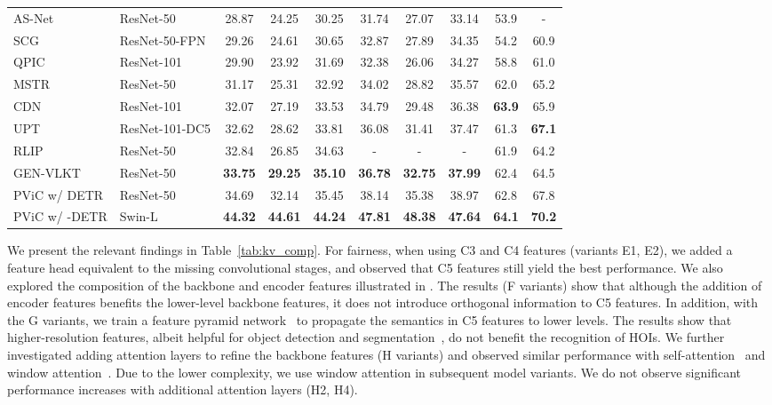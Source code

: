 \documentclass[10pt,twocolumn,letterpaper]{article}
\begin{document}
\begin{table*}[t]
\begin{tabularx}{\linewidth}{@{\extracolsep{\fill}} l l cccccccc}
      AS-Net~\cite{asnet} & ResNet-50 & 28.87 & 24.25 & 30.25 & 31.74 & 27.07 & 33.14 & 53.9 & - \\
      SCG~\cite{scg} & ResNet-50-FPN & 29.26 & 24.61 & 30.65 & 32.87 & 27.89 & 34.35 & 54.2 & 60.9 \\
      QPIC~\cite{qpic} & ResNet-101 & 29.90 & 23.92 & 31.69 & 32.38 & 26.06 & 34.27 & 58.8 & 61.0 \\
      MSTR~\cite{mstr} & ResNet-50 & 31.17 & 25.31 & 32.92 & 34.02 & 28.82 & 35.57 & 62.0 & 65.2 \\
      CDN~\cite{cdn} & ResNet-101 & 32.07 & 27.19 & 33.53 & 34.79 & 29.48 & 36.38 & \textbf{63.9} & 65.9 \\
      UPT~\cite{upt} & ResNet-101-DC5 & 32.62 & 28.62 & 33.81 & 36.08 & 31.41 & 37.47 & 61.3 & \textbf{67.1} \\
      RLIP~\cite{rlip} & ResNet-50 & 32.84 & 26.85 & 34.63 & - & - & - & 61.9 & 64.2 \\
      GEN-VLKT~\cite{gen-vlkt} & ResNet-50 & \textbf{33.75} & \textbf{29.25} & \textbf{35.10} & \textbf{36.78} & \textbf{32.75} & \textbf{37.99} & 62.4 & 64.5 \\
\midrule
     PViC w/ DETR & ResNet-50 & 34.69 & 32.14 & 35.45 & 38.14 & 35.38 & 38.97 & 62.8 & 67.8 \\
     PViC w/ -DETR & Swin-L & \textbf{44.32} & \textbf{44.61} & \textbf{44.24} & \textbf{47.81} & \textbf{48.38} & \textbf{47.64} & \textbf{64.1} & \textbf{70.2} \\
       \bottomrule
    \end{tabularx}
\end{table*}

We present the relevant findings in Table~\ref{tab:kv_comp}. For fairness, when using C3 and C4 features (variants E1, E2), we added a feature head equivalent to the missing convolutional stages, and observed that C5 features still yield the best performance. We also explored the composition of the backbone and encoder features illustrated in . The results (F variants) show that although the addition of encoder features benefits the lower-level backbone features, it does not introduce orthogonal information to C5 features. In addition, with the G variants, we train a feature pyramid network~\cite{fpn} to propagate the semantics in C5 features to lower levels. The results show that higher-resolution features, albeit helpful for object detection and segmentation~\cite{detr, ta-fcn}, do not benefit the recognition of HOIs. We further investigated adding attention layers to refine the backbone features (H variants) and observed similar performance with self-attention~\cite{xfmer} and window attention~\cite{swint}. Due to the lower complexity, we use window attention in subsequent model variants.
We do not observe significant performance increases with additional attention layers (H2, H4).
\end{document}
